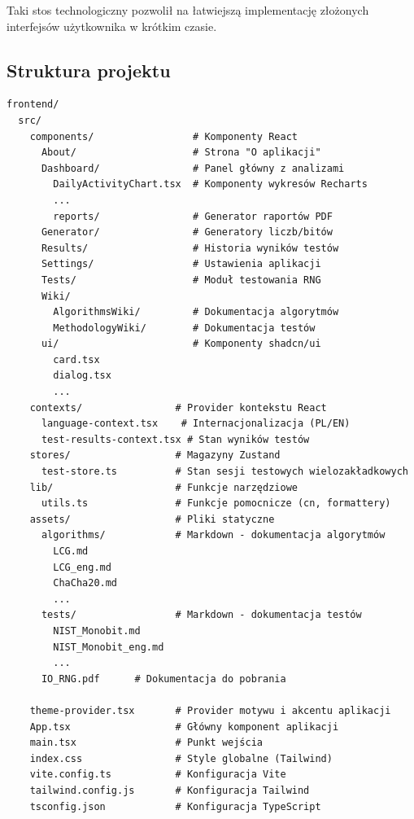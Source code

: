 \documentclass[12pt,a4paper]{article}
\begin{document}
Taki stos technologiczny pozwolił na łatwiejszą implementację złożonych interfejsów użytkownika w krótkim czasie.

\subsection{Struktura projektu}

\begin{tcolorbox}[colback=green!5!white,colframe=green!75!black,title=Drzewo katalogów frontendu,breakable]
\small
\begin{verbatim}
frontend/
  src/
    components/                 # Komponenty React
      About/                    # Strona "O aplikacji"
      Dashboard/                # Panel główny z analizami
        DailyActivityChart.tsx  # Komponenty wykresów Recharts
        ...              
        reports/                # Generator raportów PDF
      Generator/                # Generatory liczb/bitów
      Results/                  # Historia wyników testów
      Settings/                 # Ustawienia aplikacji
      Tests/                    # Moduł testowania RNG
      Wiki/                    
        AlgorithmsWiki/         # Dokumentacja algorytmów
        MethodologyWiki/        # Dokumentacja testów
      ui/                       # Komponenty shadcn/ui
        card.tsx
        dialog.tsx
        ...
    contexts/                # Provider kontekstu React
      language-context.tsx    # Internacjonalizacja (PL/EN)
      test-results-context.tsx # Stan wyników testów
    stores/                  # Magazyny Zustand
      test-store.ts          # Stan sesji testowych wielozakładkowych
    lib/                     # Funkcje narzędziowe
      utils.ts               # Funkcje pomocnicze (cn, formattery)
    assets/                  # Pliki statyczne
      algorithms/            # Markdown - dokumentacja algorytmów
        LCG.md
        LCG_eng.md
        ChaCha20.md
        ...
      tests/                 # Markdown - dokumentacja testów
        NIST_Monobit.md
        NIST_Monobit_eng.md
        ...
      IO_RNG.pdf      # Dokumentacja do pobrania
    
    theme-provider.tsx       # Provider motywu i akcentu aplikacji
    App.tsx                  # Główny komponent aplikacji
    main.tsx                 # Punkt wejścia
    index.css                # Style globalne (Tailwind)
    vite.config.ts           # Konfiguracja Vite
    tailwind.config.js       # Konfiguracja Tailwind
    tsconfig.json            # Konfiguracja TypeScript
\end{verbatim}
\end{tcolorbox}
\end{document}
